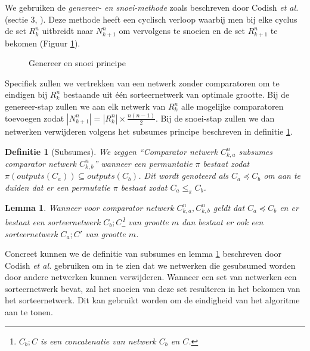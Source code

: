 \documentclass{article}
\newtheorem{lemma}{Lemma}
\newtheorem{definitie}{Definitie}
\begin{document}
We gebruiken de \textit{genereer- en snoei-methode} zoals beschreven door Codish \textit{et al.} (sectie 3, \cite{sortingNetworksSize2014}).
Deze methode heeft een cyclisch verloop waarbij men bij elke cyclus de set $R^n_k$ uitbreidt naar $N^n_{k+1}$ om vervolgens te snoeien en de set $R^n_{k+1}$ te bekomen (Figuur \ref{GenereerSnoei}).
\begin{figure}[!h]
\centering
{}
\caption{Genereer en snoei principe}
\label{GenereerSnoei}
\end{figure}
Specifiek zullen we vertrekken van een netwerk zonder comparatoren om te eindigen bij $R^n_k$ bestaande uit \'e\'en sorteernetwerk van optimale grootte.
Bij de genereer-stap zullen we aan elk netwerk van $R^n_k$ alle mogelijke comparatoren toevoegen zodat $|N^n_{k+1}| = |R^n_{k}| \times \frac{n\left(n-1\right)}{2}$.
Bij de snoei-stap zullen we dan netwerken verwijderen volgens het subsumes principe beschreven in definitie \ref{definitie1}.
\begin{definitie}[Subsumes] %
We zeggen ``Comparator netwerk $C^n_{k,a}$ subsumes comparator netwerk $C^n_{k,b}$'' wanneer een permuntatie $\pi$ bestaat zodat $\pi\left(outputs\left(C_{a}\right)\right) \subseteq outputs\left(C_{b}\right)$. Dit wordt genoteerd als $ C_{a} \preceq C_{b}$ om aan te duiden dat er een permutatie $\pi$ bestaat zodat $C_{a}\leq_\pi C_{b}$. %
\label{definitie1}
\end{definitie}
\begin{lemma}
Wanneer voor comparator netwerk $C^n_{k,a}, C^n_{k,b}$ geldt dat $ C_{a} \preceq C_{b}$ en er bestaat een sorteernetwerk $C_b;C$\footnote{$C_b;C$ is een concatenatie van netwerk $C_b$ en $C$.} van grootte $m$ dan bestaat er ook een sorteernetwerk $C_a;C'$ van grootte $m$.
\label{lemma2}
\end{lemma}
Concreet kunnen we de definitie van subsumes en lemma \ref{lemma2} beschreven door Codish \textit{et al.} \cite{sortingNetworksSize2014} gebruiken om in te zien dat we netwerken die gesubsumed worden door andere netwerken kunnen verwijderen.
Wanneer een set van netwerken een sorteernetwerk bevat, zal het snoeien van deze set resulteren in het bekomen van het sorteernetwerk.
Dit kan gebruikt worden om de eindigheid van het algoritme aan te tonen.
\end{document}
